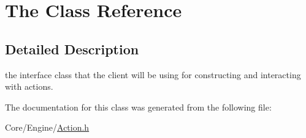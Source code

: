 \hypertarget{classThe}{\section{The Class Reference}
\label{classThe}
}


\subsection{Detailed Description}
the interface class that the client will be using for constructing and interacting with actions. 

The documentation for this class was generated from the following file\-:\begin{DoxyCompactItemize}
\item 
Core/\-Engine/\hyperlink{Action_8h}{Action.\-h}\end{DoxyCompactItemize}
